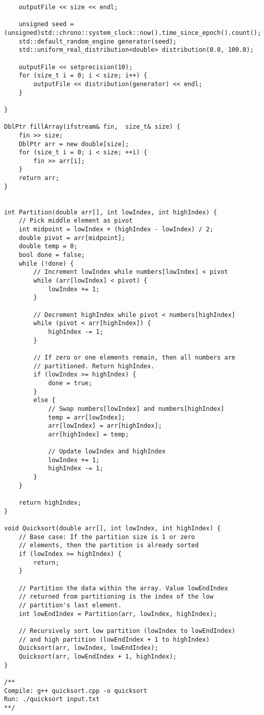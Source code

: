 \documentclass{article}
\begin{document}
\begin{lstlisting}
    outputFile << size << endl;

    unsigned seed = (unsigned)std::chrono::system_clock::now().time_since_epoch().count();
    std::default_random_engine generator(seed);
    std::uniform_real_distribution<double> distribution(0.0, 100.0);

    outputFile << setprecision(10);
    for (size_t i = 0; i < size; i++) {
        outputFile << distribution(generator) << endl;
    }

}

DblPtr fillArray(ifstream& fin,  size_t& size) {
    fin >> size;
    DblPtr arr = new double[size];
    for (size_t i = 0; i < size; ++i) {
        fin >> arr[i];
    }
    return arr;
}


int Partition(double arr[], int lowIndex, int highIndex) {
    // Pick middle element as pivot
    int midpoint = lowIndex + (highIndex - lowIndex) / 2;
    double pivot = arr[midpoint];
    double temp = 0;
    bool done = false;
    while (!done) {
        // Increment lowIndex while numbers[lowIndex] < pivot
        while (arr[lowIndex] < pivot) {
            lowIndex += 1;
        }

        // Decrement highIndex while pivot < numbers[highIndex]
        while (pivot < arr[highIndex]) {
            highIndex -= 1;
        }

        // If zero or one elements remain, then all numbers are
        // partitioned. Return highIndex.
        if (lowIndex >= highIndex) {
            done = true;
        }
        else {
            // Swap numbers[lowIndex] and numbers[highIndex]
            temp = arr[lowIndex];
            arr[lowIndex] = arr[highIndex];
            arr[highIndex] = temp;

            // Update lowIndex and highIndex
            lowIndex += 1;
            highIndex -= 1;
        }
    }

    return highIndex;
}

void Quicksort(double arr[], int lowIndex, int highIndex) {
    // Base case: If the partition size is 1 or zero
    // elements, then the partition is already sorted
    if (lowIndex >= highIndex) {
        return;
    }

    // Partition the data within the array. Value lowEndIndex
    // returned from partitioning is the index of the low
    // partition's last element.
    int lowEndIndex = Partition(arr, lowIndex, highIndex);

    // Recursively sort low partition (lowIndex to lowEndIndex)
    // and high partition (lowEndIndex + 1 to highIndex)
    Quicksort(arr, lowIndex, lowEndIndex);
    Quicksort(arr, lowEndIndex + 1, highIndex);
}

/**
Compile: g++ quicksort.cpp -o quicksort
Run: ./quicksort input.txt
**/
\end{lstlisting}
\end{document}
